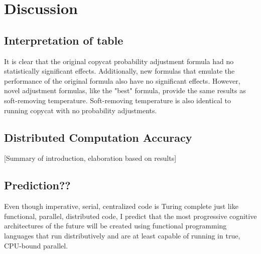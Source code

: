 \documentclass[a4paper]{article}
\begin{document}
\section{Discussion}

    \subsection{Interpretation of table}

        It is clear that the original copycat probability adjustment formula had no statistically significant effects.
        Additionally, new formulas that emulate the performance of the original formula also have no significant effects.
        However, novel adjustment formulas, like the "best" formula, provide the same results as soft-removing temperature.
        Soft-removing temperature is also identical to running copycat with no probability adjustments.
        
    \subsection{Distributed Computation Accuracy}

        [Summary of introduction, elaboration based on results]

    \subsection{Prediction??}

        Even though imperative, serial, centralized code is Turing complete just like functional, parallel, distributed code, I predict that the most progressive cognitive architectures of the future will be created using functional programming languages that run distributively and are at least capable of running in true, CPU-bound parallel. 

\printbibliography
\end{document}
